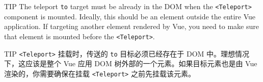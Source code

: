 \begin{paracol}{2}
\begin{vueQuote}{TIP}
The teleport \texttt{to} target must be already in the DOM when the
\texttt{\textless{}Teleport\textgreater{}} component is mounted.
Ideally, this should be an element outside the entire Vue application.
If targeting another element rendered by Vue, you need to make sure that
element is mounted before the
\texttt{\textless{}Teleport\textgreater{}}.
\end{vueQuote} 
\switchcolumn
\begin{vueQuote}{TIP}
\texttt{\textless{}Teleport\textgreater{}} 挂载时，传送的 \texttt{to}
目标必须已经存在于 DOM 中。理想情况下，这应该是整个 Vue 应用 DOM
树外部的一个元素。如果目标元素也是由 Vue 渲染的，你需要确保在挂载
\texttt{\textless{}Teleport\textgreater{}} 之前先挂载该元素。
\end{vueQuote} 
\end{paracol}

